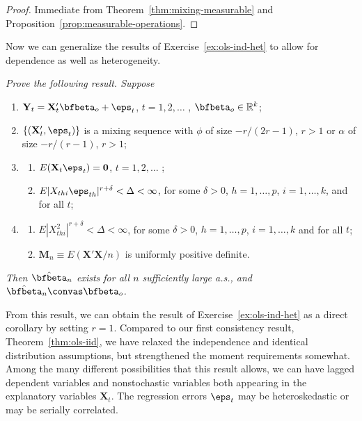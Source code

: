 \begin{proof}
Immediate from Theorem~\ref{thm:mixing-measurable} and Proposition~\ref{prop:measurable-operations}. \qedhere
\end{proof}

Now we can generalize the results of Exercise~\ref{ex:ols-ind-het} to allow for dependence as well as heterogeneity.

\begin{exercises}
\item\label{ex:ols-mixing} \emph{Prove the following result. Suppose}
\begin{enumerate}[label=(\roman*)]
\item $\mathbf{Y}_t = \mathbf{X}_t' \bfbeta_o + \eps_t$, \quad $t = 1, 2, \ldots$ , $\bfbeta_o \in \mathbb{R}^k$;
\item $\{(\mathbf{X}_t', \eps_t)\}$ is a mixing sequence with $\phi$ of size $-r/(2r-1)$, $r > 1$ or $\alpha$ of size $-r/(r-1)$, $r > 1$;
\item \begin{enumerate}[label=(\alph*)]
\item $E(\mathbf{X}_t \eps_t) = \mathbf{0}$, \quad $t = 1, 2, \ldots$ ;
\item $E|X_{thi} \eps_{th}|^{r+\delta} < \Delta < \infty$, for some $\delta > 0$, $h = 1, \ldots, p$, $i = 1, \ldots, k$, and for all $t$;
\end{enumerate}
\item \begin{enumerate}[label=(\alph*)]
\item $E|X_{thi}^2|^{r+\delta} < \Delta < \infty$, for some $\delta > 0$, $h = 1, \ldots, p$, $i = 1, \ldots, k$ and for all $t$;
\item $\mathbf{M}_n \equiv E(\mathbf{X}'\mathbf{X}/n)$ is uniformly positive definite.
\end{enumerate}
\end{enumerate}
\emph{Then $\hat{\bfbeta}_n$ exists for all $n$ sufficiently large a.s., and $\hat{\bfbeta}_n \convas \bfbeta_o$.}
\end{exercises}

From this result, we can obtain the result of Exercise~\ref{ex:ols-ind-het} as a direct corollary by setting $r = 1$. Compared to our first consistency result, Theorem~\ref{thm:ols-iid}, we have relaxed the independence and identical distribution assumptions, but strengthened the moment requirements somewhat. Among the many different possibilities that this result allows, we can have lagged dependent variables and nonstochastic variables both appearing in the explanatory variables $\mathbf{X}_t$. The regression errors $\eps_t$ may be heteroskedastic or may be serially correlated.

